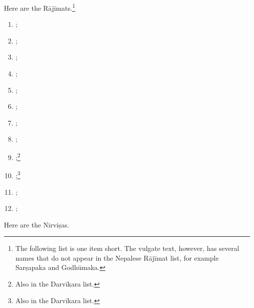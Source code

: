 \begin{translation}
\begin{multicols}{2}
\begin{enumerate}
    \end{enumerate}
\end{multicols}
        
        \medskip
        
\item[34.3]

Here are the Rājīmats.\footnote{The following list is one item short.  The 
vulgate text, however, has several names that do not appear in the Nepalese 
Rājīmat list, for example Sarṣapaka and Godhūmaka.}
\begin{multicols}{2}
    \begin{enumerate}
        \raggedright
        \item {}; 
        \item {}; 
\item {}; 
\item {}; 
\item {}; 
\item {}; 
\item {}; 
\item {}; 
\item {};\footnote{Also in the Darvīkara 
list.}  
\item {};\footnote{Also in the Darvīkara 
    list.}  
\item {}; 
\item {};
  
    \end{enumerate}
\end{multicols}

\medskip

\item[34.4]
Here are the Nirviṣas.


\end{translation}
